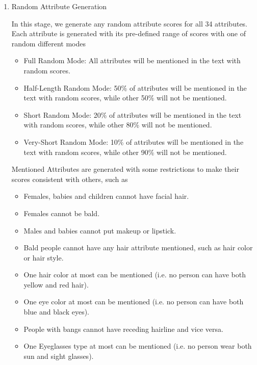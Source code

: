 \begin{enumerate}
    \item Random Attribute Generation
    
        In this stage, we generate any random attribute scores for all 34 attributes. Each attribute is generated with its pre-defined range of scores with one of random different modes
        
        \begin{itemize}
            \item Full Random Mode: All attributes will be mentioned in the text with random scores.
            
            \item Half-Length Random Mode: 50\% of attributes will be mentioned in the text with random scores, while other 50\% will not be mentioned.
            
            \item Short Random Mode: 20\% of attributes will be mentioned in the text with random scores, while other 80\% will not be mentioned.
            
            \item Very-Short Random Mode: 10\% of attributes will be mentioned in the text with random scores, while other 90\% will not be mentioned.
        \end{itemize}
        
        Mentioned Attributes are generated with some restrictions to make their scores consistent with others, such as
        \begin{itemize}
            \item Females, babies and children cannot have facial hair.
            \item Females cannot be bald.
            \item Males and babies cannot put makeup or lipstick.
            \item Bald people cannot have any hair attribute mentioned, such as hair color or hair style.
            \item One hair color at most can be mentioned (i.e. no person can have both yellow and red hair).
            \item One eye color at most can be mentioned (i.e. no person can have both blue and black eyes).
            \item People with bangs cannot have receding hairline and vice versa.
            \item One Eyeglasses type at most can be mentioned (i.e. no person wear both sun and sight glasses).
        \end{itemize}
    

\end{enumerate}

